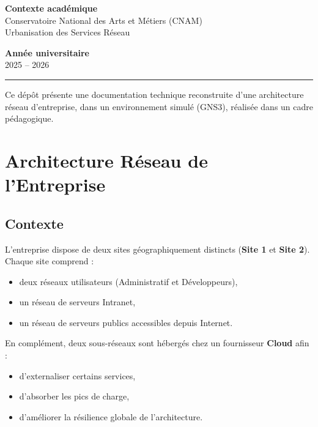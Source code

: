 \documentclass[12pt,a4paper, oneside]{memoir}
\begin{document}
\begin{center}
		\textbf{Contexte académique}\\
		Conservatoire National des Arts et Métiers (CNAM)\\
		Urbanisation des Services Réseau
		
		\vspace{0.5cm}
		
		\textbf{Année universitaire}\\
		2025 – 2026
		
		\vspace{1cm}
		
		\rule{\linewidth}{0.4mm}
		
		\vspace{0.5cm}
		
		\small
		Ce dépôt présente une documentation technique reconstruite d’une architecture
		réseau d’entreprise, dans un environnement simulé (GNS3), réalisée dans un cadre pédagogique.
		
	\end{center}
	\clearpage
	
	\pagestyle{fancy}
	\fancyhf{}
	
	\tableofcontents
	\newpage
	
	\listoffigures
	\newpage
	
	\listoftables
	\newpage


\chapter{Architecture Réseau de l’Entreprise}

\section{Contexte}

L’entreprise dispose de deux sites géographiquement distincts (\textbf{Site 1} et \textbf{Site 2}). 
Chaque site comprend :

\begin{itemize}
	\item deux réseaux utilisateurs (Administratif et Développeurs),
	\item un réseau de serveurs Intranet,
	\item un réseau de serveurs publics accessibles depuis Internet.
\end{itemize}

En complément, deux sous-réseaux sont hébergés chez un fournisseur \textbf{Cloud} afin :

\begin{itemize}
	\item d’externaliser certains services,
	\item d’absorber les pics de charge,
	\item d’améliorer la résilience globale de l’architecture.
\end{itemize}
\end{document}
